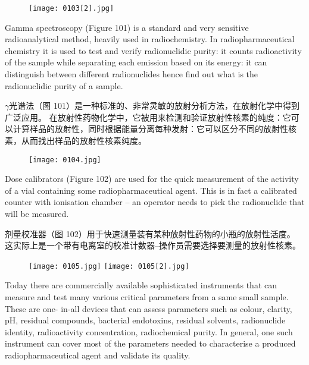 \documentclass[dvipsnames, svgnames,a4paper,11pt]{article}
\begin{document}
\begin{figure}[h]
    \centering
    \texttt{[image: 0103[2].jpg]}
     \label{fig100}
\end{figure}

Gamma spectroscopy (Figure 101) is a standard and very sensitive radioanalytical
method, heavily used in radiochemistry. In radiopharmaceutical chemistry it is used
to test and verify radionuclidic purity: it counts radioactivity of the sample while
separating each emission based on its energy: it can distinguish between different
radionuclides hence find out what is the radionuclidic purity of a sample.

$\gamma$光谱法（图 101）是一种标准的、非常灵敏的放射分析方法，在放射化学中得到广泛应用。 在放射性药物化学中，它被用来检测和验证放射性核素的纯度：它可以计算样品的放射性，同时根据能量分离每种发射：它可以区分不同的放射性核素，从而找出样品的放射性核素纯度。

\begin{figure}[h]
    \centering
    \texttt{[image: 0104.jpg]}
     \label{fig101}
\end{figure}

Dose calibrators (Figure 102) are used for the quick measurement of the activity of a
vial containing some radiopharmaceutical agent. This is in fact a calibrated counter
with ionisation chamber – an operator needs to pick the radionuclide that will be
measured.

剂量校准器（图 102）用于快速测量装有某种放射性药物的小瓶的放射性活度。 这实际上是一个带有电离室的校准计数器--操作员需要选择要测量的放射性核素。

\begin{figure}[htbp]
	\centering
    \texttt{[image: 0105.jpg]}    
    \hspace{0.1in}
    \texttt{[image: 0105[2].jpg]} 
     \label{fig102}
\end{figure}

Today there are commercially available sophisticated instruments that can measure
and test many various critical parameters from a same small sample. These are one-
in-all devices that can assess parameters such as colour, clarity, pH, residual
compounds, bacterial endotoxins, residual solvents, radionuclide identity,
radioactivity concentration, radiochemical purity. In general, one such instrument can
cover most of the parameters needed to characterise a produced
radiopharmaceutical agent and validate its quality.
\end{document}
